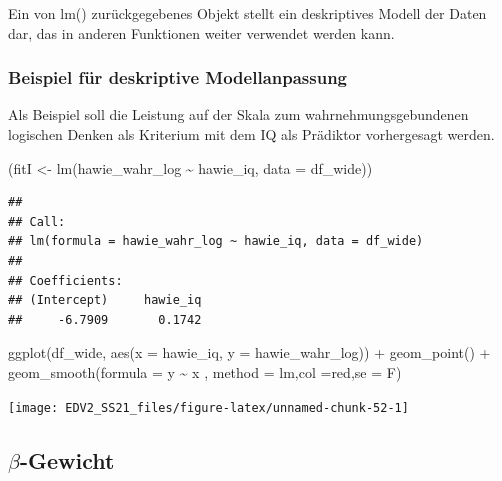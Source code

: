 \documentclass[
]{book}
\newenvironment{Shaded}{\begin{snugshade}}{\end{snugshade}}
\newcommand{\AttributeTok}[1]{\textcolor[rgb]{0.77,0.63,0.00}{#1}}
\newcommand{\FunctionTok}[1]{\textcolor[rgb]{0.00,0.00,0.00}{#1}}
\newcommand{\NormalTok}[1]{#1}
\newcommand{\OtherTok}[1]{\textcolor[rgb]{0.56,0.35,0.01}{#1}}
\newcommand{\SpecialCharTok}[1]{\textcolor[rgb]{0.00,0.00,0.00}{#1}}
\newcommand{\StringTok}[1]{\textcolor[rgb]{0.31,0.60,0.02}{#1}}
\begin{document}
Ein von lm() zurückgegebenes Objekt stellt ein deskriptives Modell der Daten dar, das in anderen Funktionen weiter verwendet werden kann.

\hypertarget{beispiel-fuxfcr-deskriptive-modellanpassung}{%
\subsubsection{Beispiel für deskriptive Modellanpassung}\label{beispiel-fuxfcr-deskriptive-modellanpassung}}

Als Beispiel soll die Leistung auf der Skala zum wahrnehmungsgebundenen logischen Denken als Kriterium mit dem IQ als Prädiktor vorhergesagt werden.

\begin{Shaded}
\begin{Highlighting}[]
\NormalTok{(fitI }\OtherTok{\textless{}{-}} \FunctionTok{lm}\NormalTok{(hawie\_wahr\_log }\SpecialCharTok{\textasciitilde{}}\NormalTok{ hawie\_iq, }\AttributeTok{data =}\NormalTok{ df\_wide)) }
\end{Highlighting}
\end{Shaded}

\begin{verbatim}
## 
## Call:
## lm(formula = hawie_wahr_log ~ hawie_iq, data = df_wide)
## 
## Coefficients:
## (Intercept)     hawie_iq  
##     -6.7909       0.1742
\end{verbatim}

\begin{Shaded}
\begin{Highlighting}[]
\FunctionTok{ggplot}\NormalTok{(df\_wide, }\FunctionTok{aes}\NormalTok{(}\AttributeTok{x =}\NormalTok{ hawie\_iq, }\AttributeTok{y =}\NormalTok{ hawie\_wahr\_log)) }\SpecialCharTok{+}
  \FunctionTok{geom\_point}\NormalTok{() }\SpecialCharTok{+}
  \FunctionTok{geom\_smooth}\NormalTok{(}\AttributeTok{formula =}\NormalTok{  y }\SpecialCharTok{\textasciitilde{}}\NormalTok{ x ,}
              \AttributeTok{method =} \StringTok{\textquotesingle{}lm\textquotesingle{}}\NormalTok{,}\AttributeTok{col =}\StringTok{\textquotesingle{}red\textquotesingle{}}\NormalTok{,}\AttributeTok{se =}\NormalTok{ F)}
\end{Highlighting}
\end{Shaded}

\begin{center}\texttt{[image: EDV2\_SS21\_files/figure-latex/unnamed-chunk-52-1]} \end{center}

\hypertarget{beta-gewicht}{%
\subsection{\texorpdfstring{\(\beta\)-Gewicht}{\textbackslash beta-Gewicht}}\label{beta-gewicht}}
\end{document}
